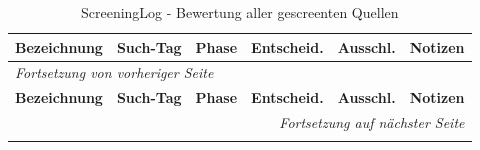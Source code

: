 \documentclass[12pt,a4paper]{article}
\begin{document}
\begin{landscape}
\small
\begin{longtable}{p{5.5cm} l l l l p{5.5cm}}
\caption{ScreeningLog - Bewertung aller gescreenten Quellen}
\label{tab:screeninglog} \\
\toprule
\textbf{Bezeichnung} & \textbf{Such-Tag} & \textbf{Phase} & \textbf{Entscheid.} & \textbf{Ausschl.} & \textbf{Notizen} \\
\midrule
\endfirsthead
\multicolumn{6}{l}{\small\textit{Fortsetzung von vorheriger Seite}} \\[0.5em]
\toprule
\textbf{Bezeichnung} & \textbf{Such-Tag} & \textbf{Phase} & \textbf{Entscheid.} & \textbf{Ausschl.} & \textbf{Notizen} \\
\midrule
\endhead
\midrule
\multicolumn{6}{r}{\small\textit{Fortsetzung auf nächster Seite}} \\
\endfoot
\bottomrule
\endlastfoot


\end{longtable}
\end{landscape}
\end{document}
